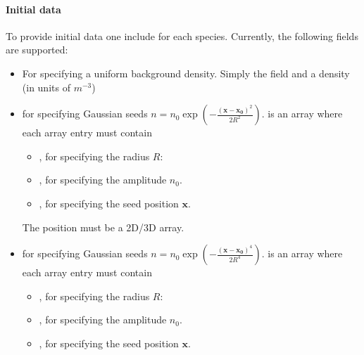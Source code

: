 \documentclass[letterpaper,10pt,english]{sphinxmanual}
\begin{document}
\paragraph{Initial data}
\label{\detokenize{Applications/CdrPlasmaModel:initial-data}}
\sphinxAtStartPar
To provide initial data one include  for each species.
Currently, the following fields are supported:
\begin{itemize}
\item {} 
\sphinxAtStartPar
{} For specifying a uniform background density.
Simply the field  and a density (in units of \(m^{-3}\))

\item {} 
\sphinxAtStartPar
{} for specifying Gaussian seeds \(n = n_0\exp\left(-\frac{\left(\mathbf{x}-\mathbf{x_0}\right)^2}{2R^2}\right)\).
 is an array where each array entry must contain
\begin{itemize}
\item {} 
\sphinxAtStartPar
{}, for specifying the radius \(R\):

\item {} 
\sphinxAtStartPar
{}, for specifying the amplitude \(n_0\).

\item {} 
\sphinxAtStartPar
{}, for specifying the seed position \(\mathbf{x}\).

\end{itemize}

\sphinxAtStartPar
The position must be a 2D/3D array.

\item {} 
\sphinxAtStartPar
{} for specifying Gaussian seeds \(n = n_0\exp\left(-\frac{\left(\mathbf{x}-\mathbf{x_0}\right)^4}{2R^4}\right)\).
 is an array where each array entry must contain
\begin{itemize}
\item {} 
\sphinxAtStartPar
{}, for specifying the radius \(R\):

\item {} 
\sphinxAtStartPar
{}, for specifying the amplitude \(n_0\).

\item {} 
\sphinxAtStartPar
{}, for specifying the seed position \(\mathbf{x}\).


\end{itemize}
\end{itemize}
\end{document}
